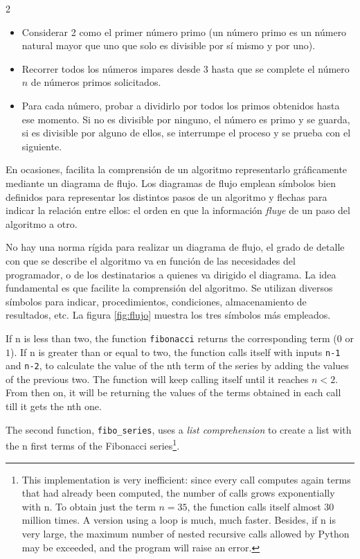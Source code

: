 \begin{paracol}{2}
\begin{itemize}
\item Considerar 2 como el primer número primo (un número primo es un número natural mayor que uno que solo es divisible por sí mismo y por uno).
\item Recorrer todos los números impares desde 3 hasta que se complete el número $n$ de números primos solicitados.
\item Para cada número, probar a dividirlo por todos los primos obtenidos hasta ese momento. Si no es divisible por ninguno, el número es primo y se guarda, si es divisible por alguno de ellos, se interrumpe el proceso y se prueba con el siguiente.
\end{itemize}

En ocasiones, facilita la comprensión de un algoritmo representarlo gráficamente mediante un diagrama de flujo. Los diagramas de flujo emplean símbolos bien definidos para representar los distintos pasos de un algoritmo y flechas para indicar la relación entre ellos: el orden en que la información \emph{fluye} de un paso del algoritmo a otro.

No hay una norma rígida para realizar un diagrama de flujo, el grado de detalle con que se describe el algoritmo va en función de las necesidades del programador, o de los destinatarios a quienes va dirigido el diagrama. La idea fundamental es que facilite la comprensión del algoritmo. Se utilizan diversos símbolos para indicar, procedimientos, condiciones, almacenamiento de resultados, etc. La figura \ref{fig:flujo} muestra los tres símbolos más empleados.

\switchcolumn
If n is less than two, the function \texttt{fibonacci} returns the corresponding term ($0$ or $1$). If n is greater than or equal to two, the function calls itself with inputs \texttt{n-1} and \texttt{n-2}, to calculate the value of the nth term of the series by adding the values of the previous two. The function will keep calling itself until it reaches $n<2$. From then on, it will be returning the values of the terms obtained in each call till it gets the nth one.

The second function, \texttt{fibo_series}, uses a \emph{list comprehension} to create a list with the n first terms of the Fibonacci series\footnote{This implementation is very inefficient: since every call computes again terms that had already been computed, the number of calls grows exponentially with n. To obtain just the term $n=35$, the function calls itself almost 30 million times. A version using a loop is much, much faster. Besides, if n is very large, the maximum number of nested recursive calls allowed by Python may be exceeded, and the program will raise an error.}.


\end{paracol}
